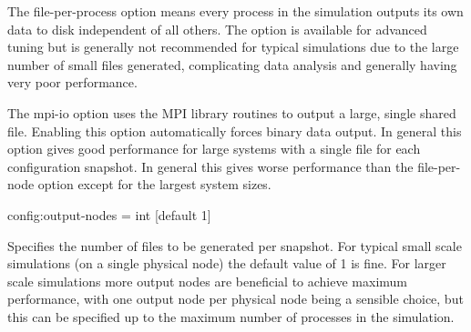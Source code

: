 The file-per-process option means every process in the simulation outputs its own data to disk independent of all others. The option is available for advanced tuning but is generally not recommended for typical simulations due to the large number of small files generated, complicating data analysis and generally having very poor performance.

The mpi-io option uses the MPI library routines to output a large, single shared file. Enabling this option automatically forces binary data output. In general this option gives good performance for large systems with a single file for each configuration snapshot. In general this gives worse performance than the file-per-node option except for the largest system sizes.

{\zicf config:output-nodes = int [default 1]} Specifies the number of files to be generated per snapshot. For typical small scale simulations (on a single physical node) the default value of 1 is fine. For larger scale simulations more output nodes are beneficial to achieve maximum performance, with one output node per physical node being a sensible choice, but
this can be specified up to the maximum number of processes in the simulation.



